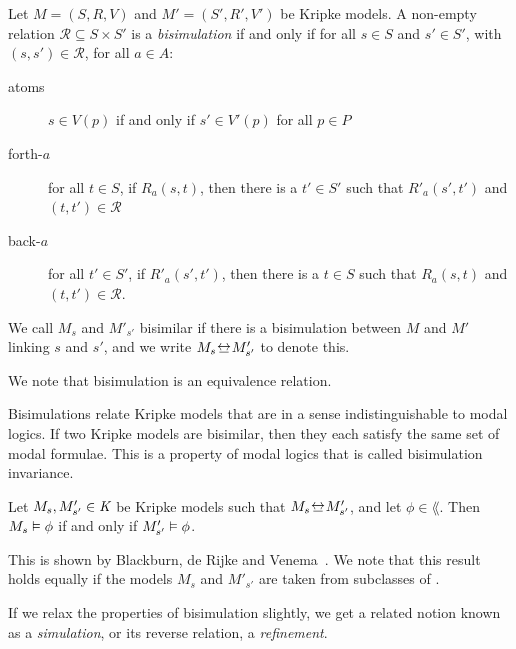 \begin{definition}[Bisimulation]
Let $M = (S, R, V)$ and $M' = (S', R', V')$ be Kripke models. A non-empty
relation $\mathcal{R} \subseteq S \times S'$ is a \textit{bisimulation} if and
only if for all $s \in S$ and $s' \in S'$, with $(s, s') \in \mathcal{R}$, for
all $a \in A$:

\begin{description}
\item[atoms] $s \in V(p)$ if and only if $s' \in V'(p)$ for all
$p \in P$

\item[forth-$a$] for all $t \in S$, if $R_a(s, t)$, then there is a
$t' \in S'$ such that $R'_a(s', t')$ and $(t,
t') \in \mathcal{R}$

\item[back-$a$] for all $t' \in S'$, if $R'_a(s',
t')$, then there is a $t \in S$ such that $R_a(s, t)$ and $(t, t')
\in \mathcal{R}$.
\end{description}

We call $M_s$ and $M'_{s'}$ bisimilar if there is a bisimulation between $M$ and
$M'$ linking $s$ and $s'$, and we write $M_s \bisim M'_{s'}$ to denote this.
\end{definition}

We note that bisimulation is an equivalence relation.

Bisimulations relate Kripke models that are in a sense indistinguishable to
modal logics. If two Kripke models are bisimilar, then they each satisfy the
same set of modal formulae. This is a property of modal logics that is called
bisimulation invariance.

\begin{lemma}
Let $M_s, M'_{s'} \in \textit{K}$ be Kripke models such that $M_s \bisim M'_{s'}$,
and let $\phi \in \lang$. Then $M_s \vDash \phi$ if and only if $M'_{s'}
\vDash \phi$.
\end{lemma}

This is shown by Blackburn, de Rijke and Venema~\cite{blackburn2002modal}. We
note that this result holds equally if the models $M_s$ and $M'_{s'}$ are taken
from subclasses of \classK{}.

If we relax the properties of bisimulation slightly, we get a related notion
known as a {\em simulation}, or its reverse relation, a {\em refinement}.

